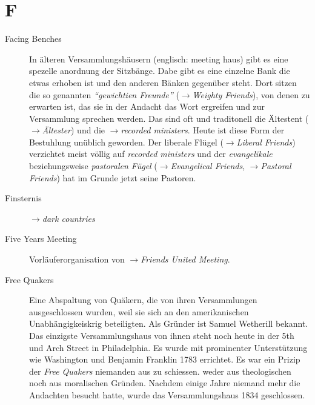 \section*{F}

\articlesize

\begin{description}

\item[Facing Benches] In älteren Versammlungshäusern (englisch: meeting haus)
gibt es eine spezelle anordnung der Sitzbänge. Dabe gibt es eine einzelne Bank
die etwas erhoben ist und den anderen Bänken gegenüber steht. Dort sitzen die
so genannten \textit{"`gewichtien Freunde"'} ($\to$\textit{Weighty Friends}),
von denen zu erwarten ist, das sie in der Andacht das Wort ergreifen und zur
Versammlung sprechen werden. Das sind oft und traditonell die Ältestent
($\to$\textit{Ältester}) und die $\to$\textit{recorded ministers}. Heute ist
diese Form der Bestuhlung unüblich geworden. Der liberale Flügel
($\to$\textit{Liberal Friends}) verzichtet meist völlig auf
\textit{recorded ministers} und der \textit{evangelikale} beziehungsweise
\textit{pastoralen Fügel} ($\to$\textit{Evangelical Friends},
$\to$\textit{Pastoral Friends}) hat im Grunde jetzt seine Pastoren.


\item[Finsternis] $\to$\textit{dark countries}


 \item[Five Years Meeting] Vorläuferorganisation von $\to$\textit{Friends
 United Meeting}.


 \item[Free Quakers] Eine Abspaltung von Quäkern, die von ihren Versammlungen
 ausgeschlossen wurden, weil sie sich an den amerikanischen Unabhängigkeiskrig
 beteiligten. Als Gründer ist Samuel Wetherill bekannt. Das einzigste
 Versammlungshaus von ihnen steht noch heute in der 5th und Arch Street in
 Philadelphia. Es wurde mit prominenter Unterstützung wie Washington und
 Benjamin Franklin 1783 errichtet. Es war ein Prizip der \textit{Free Quakers}
 niemanden aus zu schiessen. weder aus theologischen noch aus moralischen
 Gründen. Nachdem einige Jahre niemand mehr die Andachten besucht hatte, wurde
 das Versammlungshaus 1834 geschlossen.


\end{description}
